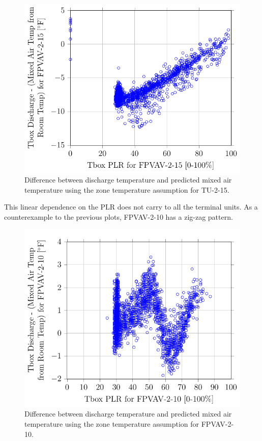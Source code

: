 \begin{figure}
\centering
\includegraphics[]{Plots/2017-01-09-1434-TboxDischargeMixedAirTempfromRoomTempforFPVAV215vsTboxPLRforFPVAV215.pdf}
\caption{Difference between discharge temperature and predicted mixed
air temperature using the zone temperature assumption for TU-2-15.}
\label{fig:2017-01-09-1434-TboxDischargeMixedAirTempfromRoomTempforFPVAV215vsTboxPLRforFPVAV215}
\end{figure}


This linear dependence on the PLR does not carry to all the terminal
units. As a counterexample to the previous plots, FPVAV-2-10 has a
zig-zag pattern. 


\begin{figure}
\centering
\includegraphics[]{Plots/2017-01-10-0906-TboxDischargeMixedAirTempfromRoomTempforFPVAV210vsTboxPLRforFPVAV210.pdf}
\caption{Difference between discharge temperature and predicted mixed
air temperature using the zone temperature assumption for FPVAV-2-10.}
\label{fig:2017-01-10-0906-TboxDischargeMixedAirTempfromRoomTempforFPVAV210vsTboxPLRforFPVAV210}
\end{figure}




